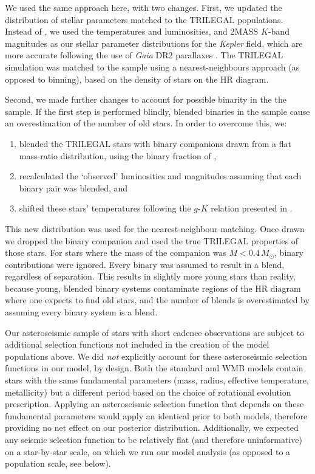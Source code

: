 \documentclass[12pt]{article}
\newcommand{\kepler}{\emph{Kepler}\xspace}
\newcommand{\gaia}{\emph{Gaia}\xspace}
\begin{document}
We used the same approach here, with two changes. First, we updated the distribution of stellar parameters matched to the TRILEGAL populations. Instead of \cite{mathur+2017}, we used the \cite{berger+2020} temperatures and luminosities, and 2MASS $K$-band magnitudes as our stellar parameter distributions for the \kepler field, which are more accurate following the use of \gaia DR2 parallaxes \cite{gaiacollaboration+2018}. The TRILEGAL simulation was matched to the \cite{berger+2020} sample using a nearest-neighbours approach (as opposed to binning), based on the density of stars on the HR diagram.

Second, we made further changes to account for possible binarity in the the \cite{berger+2020} sample. If the first step is performed blindly, blended binaries in the sample cause an overestimation of the number of old stars. In order to overcome this, we:

\begin{enumerate}
	\item blended the TRILEGAL stars with binary companions drawn from a flat mass-ratio distribution, using the binary fraction of \cite{raghavan+2010},
	\item recalculated the `observed' luminosities and magnitudes assuming that each binary pair was blended, and
	\item shifted these stars' temperatures following the $g$-$K$ relation presented in \cite{berger+2020}.
\end{enumerate}

This new distribution was used for the nearest-neighbour matching. Once drawn we dropped the binary companion and used the true TRILEGAL properties of those stars. For stars where the mass of the companion was $M < 0.4\, M_\odot$, binary contributions were ignored. Every binary was assumed to result in a blend, regardless of separation. This results in slightly more young stars than reality, because young, blended binary systems contaminate regions of the HR diagram where one expects to find old stars, and the number of blends is overestimated by assuming every binary system is a blend.

Our asteroseismic sample of stars with short cadence observations are subject to additional selection functions not included in the creation of the model populations above. We did \textit{not} explicitly account for these asteroseismic selection functions in our model, by design. Both the standard and WMB models contain stars with the same fundamental parameters (mass, radius, effective temperature, metallicity) but a different period based on the choice of rotational evolution prescription. Applying an asteroseismic selection function that depends on these fundamental parameters \cite{chaplin+2011} would apply an identical prior to both models, therefore providing no net effect on our posterior distribution. Additionally, we expected any seismic selection function to be relatively flat (and therefore uninformative) on a star-by-star scale, on which we run our model analysis (as opposed to a population scale, see below).
\end{document}

